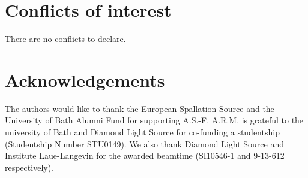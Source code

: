 \documentclass[twoside,twocolumn,9pt]{article}
\renewcommand{\refname}{Notes and references}
\begin{document}
\section*{Conflicts of interest}
There are no conflicts to declare.

\section*{Acknowledgements}
The authors would like to thank the European Spallation Source and the University of Bath Alumni Fund for supporting A.S.-F. A.R.M. is grateful to the university of Bath and Diamond Light Source for co-funding a studentship (Studentship Number STU0149). We also thank Diamond Light Source and Institute Laue-Langevin for the awarded beamtime (SI10546-1 and 9-13-612 respectively).



\balance


\end{document}
